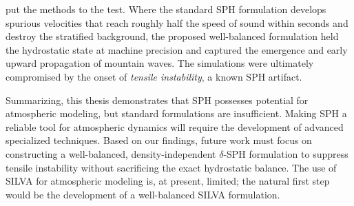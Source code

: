  put the methods to the test. Where the standard SPH formulation develops spurious velocities that reach roughly half the speed of sound within seconds and destroy the stratified background, the proposed well-balanced formulation held the hydrostatic state at machine precision and captured the emergence and early upward propagation of mountain waves. The simulations were ultimately compromised by the onset of \emph{tensile instability}, a known SPH artifact.

Summarizing, this thesis demonstrates that SPH possesses potential for atmospheric modeling, but standard formulations are insufficient. Making SPH a reliable tool for atmospheric dynamics will require the development of advanced specialized techniques. Based on our findings, future work must focus on constructing a well-balanced, density-independent $\delta$-SPH formulation to suppress tensile instability without sacrificing the exact hydrostatic balance. The use of SILVA for atmospheric modeling is, at present, limited; the natural first step would be the development of a well-balanced SILVA formulation.
